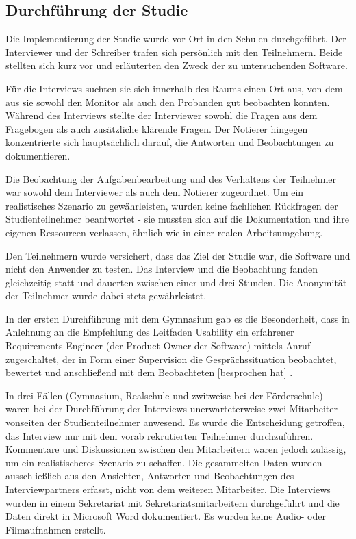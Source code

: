 \subsection{Durchführung der Studie}

Die Implementierung der Studie wurde vor Ort in den Schulen durchgeführt. Der Interviewer und der Schreiber trafen sich persönlich mit den Teilnehmern. Beide stellten sich kurz vor und erläuterten den Zweck der zu untersuchenden Software.

Für die Interviews suchten sie sich innerhalb des Raums einen Ort aus, von dem aus sie sowohl den Monitor als auch den Probanden gut beobachten konnten. Während des Interviews stellte der Interviewer sowohl die Fragen aus dem Fragebogen als auch zusätzliche klärende Fragen. Der Notierer hingegen konzentrierte sich hauptsächlich darauf, die Antworten und Beobachtungen zu dokumentieren.

Die Beobachtung der Aufgabenbearbeitung und des Verhaltens der Teilnehmer war sowohl dem Interviewer als auch dem Notierer zugeordnet. Um ein realistisches Szenario zu gewährleisten, wurden keine fachlichen Rückfragen der Studienteilnehmer beantwortet - sie mussten sich auf die Dokumentation und ihre eigenen Ressourcen verlassen, ähnlich wie in einer realen Arbeitsumgebung.

Den Teilnehmern wurde versichert, dass das Ziel der Studie war, die Software und nicht den Anwender zu testen. Das Interview und die Beobachtung fanden gleichzeitig statt und dauerten zwischen einer und drei Stunden. Die Anonymität der Teilnehmer wurde dabei stets gewährleistet.

In der ersten Durchführung mit dem Gymnasium gab es die Besonderheit, dass  in Anlehnung an die Empfehlung des Leitfaden Usability ein erfahrener Requirements Engineer (der Product Owner der Software) mittels Anruf zugeschaltet, der \glqq in Form einer Supervision die Gesprächssituation beobachtet, bewertet und anschließend mit dem Beobachteten [besprochen hat]\grqq{} \cite[p.~133]{dakks}.

In drei Fällen (Gymnasium, Realschule und zwitweise bei der Förderschule) waren bei der Durchführung der Interviews unerwarteterweise zwei Mitarbeiter vonseiten der Studienteilnehmer anwesend. Es wurde die Entscheidung getroffen, das Interview nur mit dem vorab rekrutierten Teilnehmer durchzuführen. Kommentare und Diskussionen zwischen den Mitarbeitern waren jedoch zulässig, um ein realistischeres Szenario zu schaffen. Die gesammelten Daten wurden ausschließlich aus den Ansichten, Antworten und Beobachtungen des Interviewpartners erfasst, nicht von dem weiteren Mitarbeiter. Die Interviews wurden in einem Sekretariat mit Sekretariatsmitarbeitern durchgeführt und die Daten direkt in Microsoft Word dokumentiert. Es wurden keine Audio- oder Filmaufnahmen erstellt.

